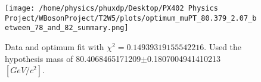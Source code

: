 \documentclass[12pt]{article}
\begin{document}
    \begin{figure}[tb]
		\centering
		\texttt{[image: /home/physics/phuxdp/Desktop/PX402 Physics Project/WBosonProject/T2W5/plots/optimum\_muPT\_80.379\_2.07\_between\_78\_and\_82\_summary.png]}
		\caption{\small Data and optimum fit with $\chi^2 = 0.14939319155542216$. Used the hypothesis mass of 80.4068465171209$\pm$0.1807004941410213 $[GeV/c^{2}]$. }
		\label{fig: fig_optim_parms}
	\end{figure}
    
\end{document}

